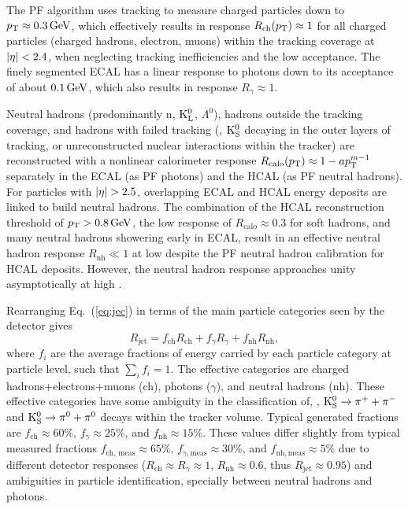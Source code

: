 \documentclass[11pt,twoside,a4paper,cmspaper,final,collab]{cms-tdr}
\begin{document}
The PF algorithm \cite{CMS-PAS-PFT-09-001, CMS-PAS-PFT-10-001} uses tracking to measure charged particles \pt down to $p_{\mathrm{T}}\approx 0.3\,\text{Ge\hspace{-.08em}V}$, which effectively results in response $R_\text{ch}(p_{\mathrm{T}})\approx1$ for all charged particles (charged hadrons, electron, muons) within the tracking coverage at $\lvert \eta \rvert<2.4$, when neglecting tracking inefficiencies and the low \pt acceptance. The finely segmented ECAL has a linear response to photons down to its acceptance of about $0.1\,\text{Ge\hspace{-.08em}V}$, which also results in response $R_\gamma\approx 1$.

Neutral hadrons (predominantly n, $\mathrm{K^0_L}$, $\Lambda^0$), hadrons outside the tracking coverage, and hadrons with failed tracking (\eg, $\mathrm{K^0_S}$ decaying in the outer layers of tracking, or unreconstructed nuclear interactions within the tracker) are reconstructed with a nonlinear calorimeter response $R_\text{calo}(p_{\mathrm{T}}) \approx 1 - ap_{\mathrm{T}}^{m-1}$ \cite{Groom:2007zz} separately in the ECAL (as PF photons) and the HCAL (as PF neutral hadrons). For  particles with $\lvert \eta \rvert>2.5$, overlapping ECAL and HCAL energy deposits are linked to build neutral hadrons.
The combination of the HCAL reconstruction threshold of $p_{\mathrm{T}}>0.8\,\text{Ge\hspace{-.08em}V}$, the low response of $R_\text{calo}\approx 0.3$ for soft hadrons, and many neutral hadrons showering early in ECAL, result in an effective neutral hadron response $R_\mathrm{nh} \ll 1$ at low \pt despite the PF neutral hadron calibration for HCAL deposits.
However, the neutral hadron response approaches unity asymptotically at high \pt.

Rearranging Eq.~(\ref{eq:jec}) in terms of the main particle categories seen by the detector gives
\begin{equation}\label{eq:jec2}
R_{\text{jet}} = f_\text{ch} R_\text{ch} + f_\gamma R_\gamma + f_\mathrm{nh} R_\mathrm{nh},
\end{equation}
where $f_i$ are the average fractions of energy carried by each particle category at particle level, such that $\sum_i f_i = 1$. The effective categories are charged hadrons+electrons+muons (ch), photons ($\gamma$), and neutral hadrons (nh).
These effective categories have some ambiguity in the classification of, \eg, $\mathrm{K^0_S}\to \pi^++\pi^-$ and $\mathrm{K^0_S}\to \pi^0+\pi^0$ decays within the tracker volume. Typical generated fractions are $f_\text{ch}\approx 60$\%, $f_\gamma\approx 25$\%, and $f_\mathrm{nh}\approx 15$\%. These values differ slightly from typical measured fractions $f_\text{ch, meas}\approx 65$\%, $f_{\gamma, \text{meas}}\approx 30$\%, and $f_\mathrm{nh, meas}\approx 5$\% due to different detector responses ($R_\text{ch}\approx R_\gamma\approx 1$, $R_\mathrm{nh}\approx 0.6$, thus $R_\text{jet}\approx 0.95$) and ambiguities in particle identification, specially between neutral hadrons and photons.
\end{document}
